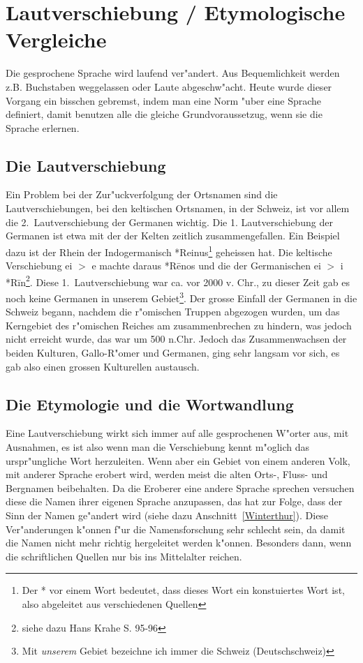 \documentclass[10pt]{article}
\begin{document}
\section{Lautverschiebung / Etymologische Vergleiche}
Die gesprochene Sprache wird laufend ver"andert. Aus Bequemlichkeit werden
z.B. Buchstaben weggelassen oder Laute abgeschw"acht. Heute wurde dieser
Vorgang ein bisschen gebremst, indem man eine Norm "uber eine Sprache
definiert, damit benutzen alle die gleiche Grundvoraussetzug, wenn sie
die Sprache erlernen.

\subsection{Die Lautverschiebung} \label{Laut}
Ein Problem bei der Zur"uckverfolgung der Ortsnamen sind die Lautverschiebungen,
bei den keltischen Ortsnamen, in der Schweiz, ist vor allem die 2.~Lautverschiebung
der Germanen wichtig. Die 
1. Lautverschiebung der Germanen ist etwa mit der der Kelten zeitlich zusammengefallen.
Ein Beispiel dazu ist der Rhein der Indogermanisch *Reinus\footnote{Der *
vor einem Wort bedeutet, dass dieses Wort ein konstuiertes Wort ist, also
abgeleitet aus verschiedenen Quellen} geheissen hat. Die keltische Verschiebung
ei $>$ e machte daraus *R\=enos und die der Germanischen ei $>$ i *R\=in\footnote{
siehe dazu Hans Krahe \cite{IDG:KRAHE} S. 95-96}. Diese 1.~Lautverschiebung war
ca. vor 2000 v. Chr., zu dieser Zeit gab es noch keine
Germanen in unserem Gebiet\footnote{Mit {\sl unserem} Gebiet bezeichne ich immer
die Schweiz (Deutschschweiz)}. Der grosse Einfall der Germanen in die Schweiz
begann, nachdem die r"omischen Truppen abgezogen wurden, um das Kerngebiet des r"omischen Reiches
am zusammenbrechen zu hindern, was jedoch nicht erreicht wurde, das war um 500 n.Chr. Jedoch das Zusammenwachsen der
beiden Kulturen, Gallo-R"omer und Germanen, ging sehr langsam vor sich, es
gab also einen grossen Kulturellen austausch.

\onecolumn
\subsection{Die Etymologie und die Wortwandlung} \label{Etym}
Eine Lautverschiebung wirkt sich immer auf alle gesprochenen W"orter aus, mit
Ausnahmen, es ist also wenn man die Verschiebung kennt m"oglich das urspr"ungliche
Wort herzuleiten. Wenn aber ein Gebiet von einem anderen Volk, mit anderer
Sprache erobert wird, werden meist die alten Orts-, Fluss- und Bergnamen beibehalten.
Da die Eroberer eine andere Sprache sprechen versuchen diese die Namen ihrer eigenen
Sprache anzupassen, das hat zur Folge, dass der Sinn der Namen ge"andert
wird (siehe dazu Anschnitt~\ref{Winterthur}). Diese Ver"anderungen
k"onnen f"ur die Namensforschung sehr schlecht sein, da damit die Namen
nicht mehr richtig hergeleitet werden k"onnen. Besonders dann, wenn die 
schriftlichen Quellen nur bis ins Mittelalter reichen.
\end{document}
